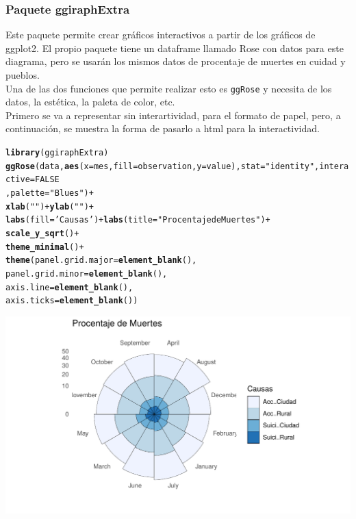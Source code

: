 \documentclass{article}\usepackage[]{graphicx}\usepackage[]{color}
\makeatletter
\def\maxwidth{ %
  \ifdim\Gin@nat@width>\linewidth
    \linewidth
  \else
    \Gin@nat@width
  \fi
}
\newcommand{\hlnum}[1]{\textcolor[rgb]{0.686,0.059,0.569}{#1}}%
\newcommand{\hlstr}[1]{\textcolor[rgb]{0.192,0.494,0.8}{#1}}%
\newcommand{\hlopt}[1]{\textcolor[rgb]{0,0,0}{#1}}%
\newcommand{\hlstd}[1]{\textcolor[rgb]{0.345,0.345,0.345}{#1}}%
\newcommand{\hlkwc}[1]{\textcolor[rgb]{0.333,0.667,0.333}{#1}}%
\newcommand{\hlkwd}[1]{\textcolor[rgb]{0.737,0.353,0.396}{\textbf{#1}}}%
\newenvironment{kframe}{%
 \def\at@end@of@kframe{}%
 \ifinner\ifhmode%
  \def\at@end@of@kframe{\end{minipage}}%
  \begin{minipage}{\columnwidth}%
 \fi\fi%
 \def\FrameCommand##1{\hskip\@totalleftmargin \hskip-\fboxsep
 \colorbox{shadecolor}{##1}\hskip-\fboxsep
     \hskip-\linewidth \hskip-\@totalleftmargin \hskip\columnwidth}%
 \MakeFramed {\advance\hsize-\width
   \@totalleftmargin\z@ \linewidth\hsize
   \@setminipage}}%
 {\par\unskip\endMakeFramed%
 \at@end@of@kframe}
\newenvironment{knitrout}{}{} %
\makeatother
\begin{document}
\subsubsection{Paquete ggiraphExtra}
Este paquete\cite{docu_ggiraphExtra} permite crear gr\'aficos interactivos a partir de los gr\'aficos de ggplot2. El propio paquete tiene un dataframe llamado Rose con datos para este diagrama, pero se usar\'an los mismos datos de procentaje de muertes en cuidad y pueblos.~\\
Una de las dos funciones que permite realizar esto es \texttt{ggRose} y necesita de los datos, la est\'etica, la paleta de color, etc.~\\
Primero se va a representar sin interartividad, para el formato de papel, pero, a continuaci\'on, se muestra la forma de pasarlo a html para la interactividad.
\begin{knitrout}
\color{fgcolor}\begin{kframe}
\begin{alltt}
\hlkwd{library}\hlstd{(ggiraphExtra)}
\hlkwd{ggRose}\hlstd{(data,}\hlkwd{aes}\hlstd{(}\hlkwc{x}\hlstd{=mes,}\hlkwc{fill}\hlstd{=observation,}\hlkwc{y}\hlstd{=value),}\hlkwc{stat}\hlstd{=}\hlstr{"identity"}\hlstd{,}\hlkwc{interactive}\hlstd{=}\hlnum{FALSE}
       \hlstd{,} \hlkwc{palette} \hlstd{=} \hlstr{"Blues"}\hlstd{)} \hlopt{+}
   \hlkwd{xlab}\hlstd{(}\hlstr{""}\hlstd{)} \hlopt{+}  \hlkwd{ylab}\hlstd{(}\hlstr{""}\hlstd{)} \hlopt{+}
  \hlkwd{labs}\hlstd{(}\hlkwc{fill}\hlstd{=}\hlstr{'Causas'}\hlstd{)} \hlopt{+} \hlkwd{labs}\hlstd{(}\hlkwc{title} \hlstd{=} \hlstr{"Procentaje de Muertes"}\hlstd{)} \hlopt{+}
  \hlkwd{scale_y_sqrt}\hlstd{()} \hlopt{+}
  \hlkwd{theme_minimal}\hlstd{()} \hlopt{+}
  \hlkwd{theme}\hlstd{(}\hlkwc{panel.grid.major} \hlstd{=} \hlkwd{element_blank}\hlstd{(),}
        \hlkwc{panel.grid.minor} \hlstd{=} \hlkwd{element_blank}\hlstd{(),}
        \hlkwc{axis.line} \hlstd{=} \hlkwd{element_blank}\hlstd{(),}
        \hlkwc{axis.ticks} \hlstd{=} \hlkwd{element_blank}\hlstd{())}
\end{alltt}
\end{kframe}

{\centering \includegraphics[width=\maxwidth]{figure/plot_rose_ggiraph-1} 

}



\end{knitrout}
\end{document}
